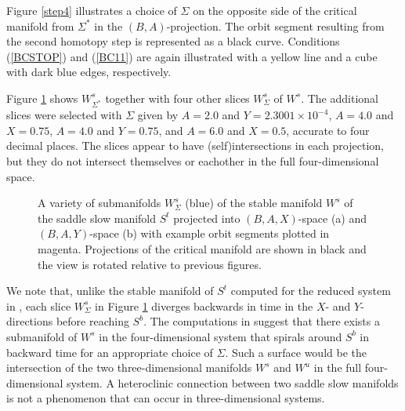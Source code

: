 \documentclass{ws-ijbc}
\begin{document}
Figure \ref{step4} illustrates a choice of $\Sigma$ on the opposite side of the critical manifold from $\Sigma^*$ in the $(B,A)$-projection.  The orbit segment resulting from the second homotopy step is represented as a black curve.  Conditions (\ref{BCSTOP}) and (\ref{BC11}) are again illustrated with a yellow line and a cube with dark blue edges, respectively.
    
Figure \ref{pieces} shows $W^s_{\Sigma^*}$ together with four other slices $W^{s}_{\Sigma}$ of $W^{s}$.  The additional slices were selected with $\Sigma$ given by $A=2.0$ and $Y=2.3001 \times 10^{-4}$, $A=4.0$ and $X=0.75$, $A=4.0$ and $Y=0.75$, and $A=6.0$ and $X=0.5$, accurate to four decimal places.  The slices appear to have (self)intersections in each projection, but they do not intersect themselves or eachother in the full four-dimensional space.  

\begin{figure}[h]
\centering
{}
\caption{A variety of submanifolds $W^{s}_{\Sigma}$ (blue) of the stable manifold $W^s$ of the saddle slow manifold $S^t$ projected into $(B,A,X)$-space (a) and $(B,A,Y)$-space (b) with example orbit segments plotted in magenta.  Projections of the critical manifold are shown in black and the view is rotated relative to previous figures.}
\label{pieces}
\end{figure}
    
We note that, unlike the stable manifold of $S^t$ computed for the reduced system in \cite{QSSA}, each slice $W^{s}_{\Sigma}$ in Figure \ref{pieces} diverges backwards in time in the $X$- and $Y$- directions before reaching $S^b$.  The computations in \cite{QSSA} suggest that there exists a  submanifold of $W^s$ in the four-dimensional system that spirals around $S^b$ in backward time for an appropriate choice of $\Sigma$.  Such a surface would be the intersection of the two three-dimensional manifolds $W^s$ and $W^u$ in the full four-dimensional system.  A heteroclinic connection between two saddle slow manifolds is not a phenomenon that can occur in three-dimensional systems.
\end{document}
